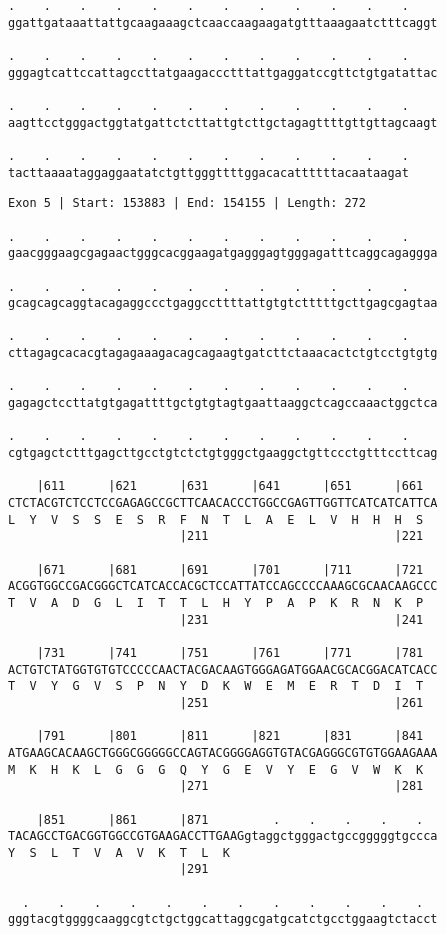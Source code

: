 \documentclass{article}
\begin{document}
\newpage
\begin{Verbatim}[fontfamily=courier]
.    .    .    .    .    .    .    .    .    .    .    .    
ggattgataaattattgcaagaaagctcaaccaagaagatgtttaaagaatctttcaggt

.    .    .    .    .    .    .    .    .    .    .    .    
gggagtcattccattagccttatgaagaccctttattgaggatccgttctgtgatattac

.    .    .    .    .    .    .    .    .    .    .    .    
aagttcctgggactggtatgattctcttattgtcttgctagagttttgttgttagcaagt

.    .    .    .    .    .    .    .    .    .    .    .
tacttaaaataggaggaatatctgttgggttttggacacattttttacaataagat
\end{Verbatim}
\newpage
\begin{Verbatim}[fontfamily=courier]
Exon 5 | Start: 153883 | End: 154155 | Length: 272

.    .    .    .    .    .    .    .    .    .    .    .    
gaacgggaagcgagaactgggcacggaagatgagggagtgggagatttcaggcagaggga

.    .    .    .    .    .    .    .    .    .    .    .    
gcagcagcaggtacagaggccctgaggccttttattgtgtctttttgcttgagcgagtaa

.    .    .    .    .    .    .    .    .    .    .    .    
cttagagcacacgtagagaaagacagcagaagtgatcttctaaacactctgtcctgtgtg

.    .    .    .    .    .    .    .    .    .    .    .    
gagagctccttatgtgagattttgctgtgtagtgaattaaggctcagccaaactggctca

.    .    .    .    .    .    .    .    .    .    .    .    
cgtgagctctttgagcttgcctgtctctgtgggctgaaggctgttccctgtttccttcag

    |611      |621      |631      |641      |651      |661  
CTCTACGTCTCCTCCGAGAGCCGCTTCAACACCCTGGCCGAGTTGGTTCATCATCATTCA
L  Y  V  S  S  E  S  R  F  N  T  L  A  E  L  V  H  H  H  S  
                        |211                          |221  

    |671      |681      |691      |701      |711      |721  
ACGGTGGCCGACGGGCTCATCACCACGCTCCATTATCCAGCCCCAAAGCGCAACAAGCCC
T  V  A  D  G  L  I  T  T  L  H  Y  P  A  P  K  R  N  K  P  
                        |231                          |241  

    |731      |741      |751      |761      |771      |781  
ACTGTCTATGGTGTGTCCCCCAACTACGACAAGTGGGAGATGGAACGCACGGACATCACC
T  V  Y  G  V  S  P  N  Y  D  K  W  E  M  E  R  T  D  I  T  
                        |251                          |261  

    |791      |801      |811      |821      |831      |841  
ATGAAGCACAAGCTGGGCGGGGGCCAGTACGGGGAGGTGTACGAGGGCGTGTGGAAGAAA
M  K  H  K  L  G  G  G  Q  Y  G  E  V  Y  E  G  V  W  K  K  
                        |271                          |281  

    |851      |861      |871         .    .    .    .    .  
TACAGCCTGACGGTGGCCGTGAAGACCTTGAAGgtaggctgggactgccgggggtgccca
Y  S  L  T  V  A  V  K  T  L  K                             
                        |291                                

  .    .    .    .    .    .    .    .    .    .    .    .  
gggtacgtggggcaaggcgtctgctggcattaggcgatgcatctgcctggaagtctacct

\end{Verbatim}
\end{document}
